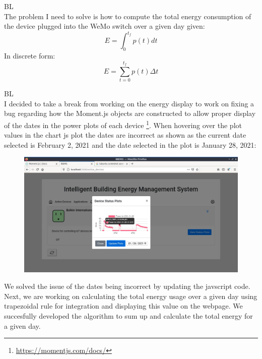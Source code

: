 \documentclass[fontsize=11pt, %
                             paper=letter, %
                             openany, %
                             captions=tableheading,
                             index=totoc,
                             hyperref]{labbook}
\begin{document}
BL\\
The problem I need to solve is how to compute the total energy consumption of the device plugged into the WeMo switch over a given day given:
\[
E = \int_0^{t_f} p(t)dt
\]
In discrete form:
\[
E = \sum_{t = 0}^{t_f} p(t)\Delta t
\]

BL\\
I decided to take a break from working on the energy display to work on fixing a bug regarding how the Moment.js objects are constructed to allow proper display of the dates in the power plots of each device \footnote{\url{https://momentjs.com/docs/}}. When hovering over the plot values in the chart js plot the dates are incorrect as shown as the current date selected is February 2, 2021 and the date selected in the plot is January 28, 2021:
\begin{figure}[H]
\centering
\includegraphics[scale=0.4]{figs/img/badDate.jpg}
\end{figure}   
We solved the issue of the dates being incorrect by updating the javscript code. Next, we are working on calculating the total energy usage over a given day using trapezoidal rule for integration and displaying this value on the webpage. We succesfully developed the algorithm to sum up and calculate the total energy for a given day.
\end{document}
